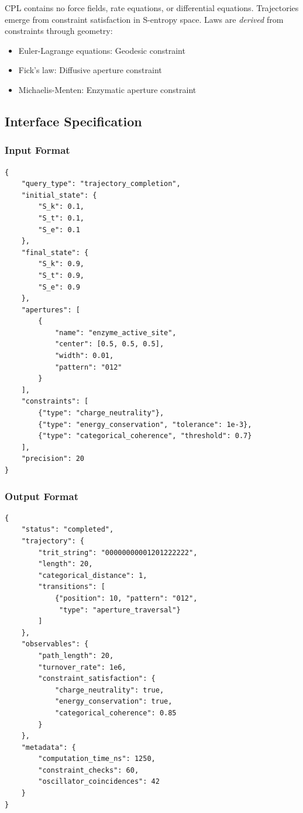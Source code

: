 \documentclass[11pt,twocolumn,a4paper]{article}
\theoremstyle{remark}
\begin{document}
CPL contains no force fields, rate equations, or differential equations. Trajectories emerge from constraint satisfaction in S-entropy space. Laws are \emph{derived} from constraints through geometry:
\begin{itemize}
\item Euler-Lagrange equations: Geodesic constraint
\item Fick's law: Diffusive aperture constraint
\item Michaelis-Menten: Enzymatic aperture constraint
\end{itemize}

\subsection{Interface Specification}

\subsubsection{Input Format}

\begin{verbatim}
{
    "query_type": "trajectory_completion",
    "initial_state": {
        "S_k": 0.1,
        "S_t": 0.1,
        "S_e": 0.1
    },
    "final_state": {
        "S_k": 0.9,
        "S_t": 0.9,
        "S_e": 0.9
    },
    "apertures": [
        {
            "name": "enzyme_active_site",
            "center": [0.5, 0.5, 0.5],
            "width": 0.01,
            "pattern": "012"
        }
    ],
    "constraints": [
        {"type": "charge_neutrality"},
        {"type": "energy_conservation", "tolerance": 1e-3},
        {"type": "categorical_coherence", "threshold": 0.7}
    ],
    "precision": 20
}
\end{verbatim}

\subsubsection{Output Format}

\begin{verbatim}
{
    "status": "completed",
    "trajectory": {
        "trit_string": "00000000001201222222",
        "length": 20,
        "categorical_distance": 1,
        "transitions": [
            {"position": 10, "pattern": "012", 
             "type": "aperture_traversal"}
        ]
    },
    "observables": {
        "path_length": 20,
        "turnover_rate": 1e6,
        "constraint_satisfaction": {
            "charge_neutrality": true,
            "energy_conservation": true,
            "categorical_coherence": 0.85
        }
    },
    "metadata": {
        "computation_time_ns": 1250,
        "constraint_checks": 60,
        "oscillator_coincidences": 42
    }
}
\end{verbatim}
\end{document}
